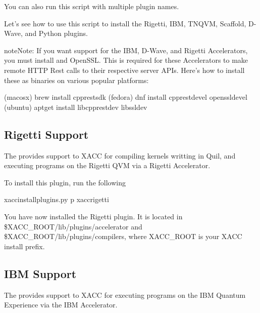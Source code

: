\documentclass[letterpaper,10pt,english]{sphinxmanual}
\begin{document}
You can also run this script with multiple plugin names.

Let’s see how to use this script to install the
Rigetti, IBM, TNQVM, Scaffold, D-Wave, and Python plugins.

\begin{sphinxadmonition}{note}{Note:}
If you want support for the IBM, D-Wave, and Rigetti Accelerators, you must install
 and OpenSSL. This
is required for these Accelerators to make remote HTTP Rest calls to their
respective server APIs. Here’s how to install these as binaries on various popular platforms:

\begin{sphinxVerbatim}[commandchars=\\\{\}]
\PYGZdl{} (macosx) brew install cpprestsdk
\PYGZdl{} (fedora) dnf install cpprest\PYGZhy{}devel openssl\PYGZhy{}devel
\PYGZdl{} (ubuntu) apt\PYGZhy{}get install libcpprest\PYGZhy{}dev libssl\PYGZhy{}dev
\end{sphinxVerbatim}
\end{sphinxadmonition}


\subsection{Rigetti Support}
\label{\detokenize{install:rigetti-support}}
The  provides
support to XACC for compiling kernels writting in Quil, and executing programs
on the Rigetti QVM via a Rigetti Accelerator.

To install this plugin, run the following

\begin{sphinxVerbatim}[commandchars=\\\{\}]
\PYGZdl{} xacc\PYGZhy{}install\PYGZhy{}plugins.py \PYGZhy{}p xacc\PYGZhy{}rigetti
\end{sphinxVerbatim}

You have now installed the Rigetti plugin. It is located in \$XACC\_ROOT/lib/plugins/accelerator
and \$XACC\_ROOT/lib/plugins/compilers, where XACC\_ROOT is your XACC install prefix.


\subsection{IBM Support}
\label{\detokenize{install:ibm-support}}
The  provides
support to XACC for executing programs
on the IBM Quantum Experience via the IBM Accelerator.
\end{document}
